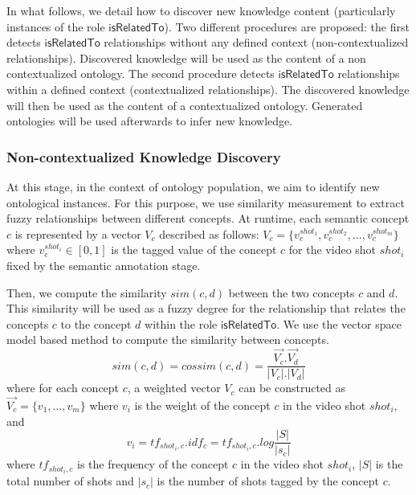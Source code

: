 		In what follows, we detail how to discover new knowledge content (particularly instances of the role 
		$\mathsf{isRelatedTo}$). Two different procedures are proposed: the first detects  
		$\mathsf{isRelatedTo}$ relationships without any defined context (non-contextualized relationships). 
		Discovered knowledge will be used as the content of a non contextualized ontology. 
		The second  procedure detects $\mathsf{isRelatedTo}$ relationships within a defined context 
		(contextualized relationships). The discovered knowledge will then be used as the content of 
		a contextualized ontology. Generated ontologies will be used afterwards to infer new knowledge.
		

		\subsubsection{Non-contextualized Knowledge Discovery}
			At this stage, in the context of ontology population, we aim to identify 
			new ontological instances. 
			For this purpose, we use similarity measurement to extract fuzzy 
			relationships between different concepts. 
			At runtime, each semantic concept $c$ is represented by a vector $V_{c}$  described as follows: 
			$V_{c} =\{v^{shot_{1}}_{c},v^{shot_{2}}_{c}, \dots, v^{shot_{m}}_{c}\}$ 
			where $v^{shot_{i}}_{c} \in [0,1]$ 
			is the tagged value of the concept $c$ for the video shot $shot_{i}$ fixed
			by the semantic annotation stage.

			Then, we compute the similarity $sim(c,d) $ between the two concepts $c$ and $d$. 
			This similarity will be used as a fuzzy degree for the relationship that relates the concepts
			$c$ to the concept $d$ within the role $\mathsf{isRelatedTo}$. 
			We use the vector space model based method to compute the similarity between concepts.
			\begin{equation}
				sim(c,d) = cossim(c,d) = \frac{\vec{V_{c}} . 
				\vec{V_{d}}}{|V_{c}| . |V_{d}|}
			\end{equation}
			where for each concept $c$, a weighted vector $V_{c}$ can be constructed as
			$\vec{V_{c}}=\{v_{1},\dots, v_{m}\}$ where $v_{i}$ is the weight of the concept $c$ in the video 
			shot $shot_{i}$, and 
			\begin{equation}
				v_{i}= tf_{shot_{i},c}.idf_{c} = tf_{shot_{i},c}.log\frac{|S|}{|s_{c}|}
			\end{equation}
			where $tf_{shot_{i},c}$ is the frequency of the concept $c$ in the
			video shot $shot_{i}$, $|S|$ is the total number of shots and $|s_{c}|$ is 
			the number of shots tagged by the concept $c$.

